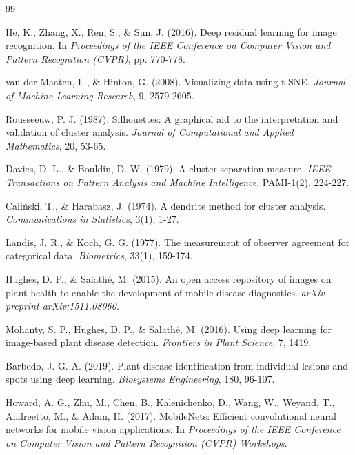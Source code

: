 \begin{thebibliography}{99}

He, K., Zhang, X., Ren, S., \& Sun, J. (2016). Deep residual learning for image recognition.
In \textit{Proceedings of the IEEE Conference on Computer Vision and Pattern Recognition (CVPR)}, pp. 770-778.

van der Maaten, L., \& Hinton, G. (2008). Visualizing data using t-SNE.
\textit{Journal of Machine Learning Research}, 9, 2579-2605.

Rousseeuw, P. J. (1987). Silhouettes: A graphical aid to the interpretation and validation of cluster analysis.
\textit{Journal of Computational and Applied Mathematics}, 20, 53-65.

Davies, D. L., \& Bouldin, D. W. (1979). A cluster separation measure.
\textit{IEEE Transactions on Pattern Analysis and Machine Intelligence}, PAMI-1(2), 224-227.

Caliński, T., \& Harabasz, J. (1974). A dendrite method for cluster analysis.
\textit{Communications in Statistics}, 3(1), 1-27.

Landis, J. R., \& Koch, G. G. (1977). The measurement of observer agreement for categorical data.
\textit{Biometrics}, 33(1), 159-174.


Hughes, D. P., \& Salathé, M. (2015). An open access repository of images on plant health to enable the development of mobile disease diagnostics.
\textit{arXiv preprint arXiv:1511.08060}.

Mohanty, S. P., Hughes, D. P., \& Salathé, M. (2016). Using deep learning for image-based plant disease detection.
\textit{Frontiers in Plant Science}, 7, 1419.

Barbedo, J. G. A. (2019). Plant disease identification from individual lesions and spots using deep learning.
\textit{Biosystems Engineering}, 180, 96-107.

Howard, A. G., Zhu, M., Chen, B., Kalenichenko, D., Wang, W., Weyand, T., Andreetto, M., \& Adam, H. (2017). MobileNets: Efficient convolutional neural networks for mobile vision applications.
In \textit{Proceedings of the IEEE Conference on Computer Vision and Pattern Recognition (CVPR) Workshops}.


\end{thebibliography}
